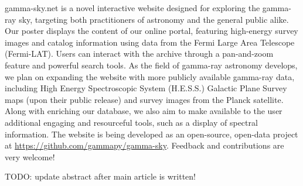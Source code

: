 gamma-sky.net is a novel interactive website designed for exploring the gamma-ray sky, targeting both practitioners of astronomy and the general public alike. Our poster displays the content of our online portal, featuring high-energy survey images and catalog information using data from the Fermi Large Area Telescope (Fermi-LAT).  Users can interact with the archive through a pan-and-zoom feature and powerful search tools. As the field of gamma-ray astronomy develops, we plan on expanding the website with more publicly available gamma-ray data, including High Energy Spectroscopic System (H.E.S.S.) Galactic Plane Survey maps (upon their public release) and survey images from the Planck satellite. Along with enriching our database, we also aim to make available to the user additional engaging and resourceful tools, such as a display of spectral information. The website is being developed as an open-source, open-data project at \url{https://github.com/gammapy/gamma-sky}. Feedback and contributions are very welcome!

TODO: update abstract after main article is written!

